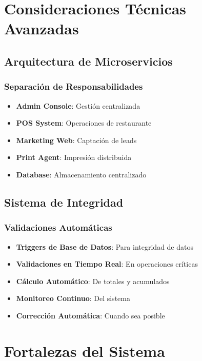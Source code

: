 \documentclass[12pt,a4paper]{article}
\begin{document}
\section{Consideraciones Técnicas Avanzadas}

\subsection{Arquitectura de Microservicios}

\subsubsection{Separación de Responsabilidades}
\begin{itemize}
    \item \textbf{Admin Console}: Gestión centralizada
    \item \textbf{POS System}: Operaciones de restaurante
    \item \textbf{Marketing Web}: Captación de leads
    \item \textbf{Print Agent}: Impresión distribuida
    \item \textbf{Database}: Almacenamiento centralizado
\end{itemize}

\subsection{Sistema de Integridad}

\subsubsection{Validaciones Automáticas}
\begin{itemize}
    \item \textbf{Triggers de Base de Datos}: Para integridad de datos
    \item \textbf{Validaciones en Tiempo Real}: En operaciones críticas
    \item \textbf{Cálculo Automático}: De totales y acumulados
    \item \textbf{Monitoreo Continuo}: Del sistema
    \item \textbf{Corrección Automática}: Cuando sea posible
\end{itemize}

\section{Fortalezas del Sistema}
\end{document}
